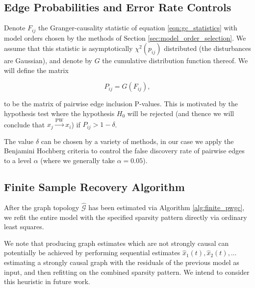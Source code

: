 \documentclass{statsoc}
\def\pwgc{\overset{\text{PW}}{\rightarrow}}  %
\def\gcg{\mathcal{G}}  %
\begin{document}
\subsection{Edge Probabilities and Error Rate Controls}
\label{sec:error_rate_control}
Denote $F_{ij}$ the Granger-causality statistic of equation
\ref{eqn:gc_statistics} with model orders chosen by the methods of
Section \ref{sec:model_order_selection}.  We assume that this
statistic is asymptotically $\chi^2(p_{ij})$ distributed (the
disturbances are Gaussian), and denote by $G$ the cumulative
distribution function thereof.  We will define the matrix

\begin{equation}
  \label{eqn:edge_inclusion_probability}
  P_{ij} = G(F_{ij}),
\end{equation}

to be the matrix of pairwise edge inclusion P-values.  This is
motivated by the hypothesis test where the hypothesis $H_0$ will be
rejected (and thence we will conclude that $x_j \pwgc x_i$) if
$P_{ij} > 1 - \delta$.

The value $\delta$ can be chosen by a variety of methods, in our case
we apply the Benjamini Hochberg criteria \cite{benjamini_hochberg}
\cite{all_of_statistics} to control the false discovery rate of
pairwise edges to a level $\alpha$ (where we generally take
$\alpha = 0.05$).

\subsection{Finite Sample Recovery Algorithm}
\label{sec:finite_pwgc}

After the graph topology $\widehat{\gcg}$ has been estimated via
Algorithm \ref{alg:finite_pwgc}, we refit the entire model with the
specified sparsity pattern directly via ordinary least squares.

We note that producing graph estimates which are not strongly causal
can potentially be achieved by performing sequential estimates
$\widehat{x}_1(t), \widehat{x}_2(t), \ldots$ estimating a strongly causal
graph with the residuals of the previous model as input, and then
refitting on the combined sparsity pattern.  We intend to consider
this heuristic in future work.
\end{document}

